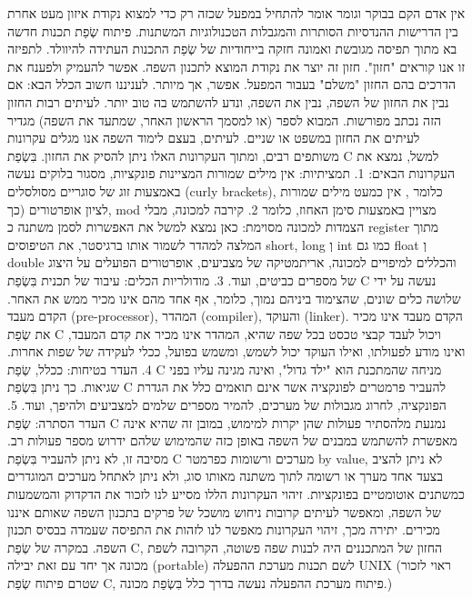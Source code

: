       אין אדם הקם בבוקר וגומר אומר להתחיל במפעל שכזה רק כדי למצוא נקודת איזון מעט אחרת בין הדרישות ההנדסיות הסותרות והמגבלות הטכנולוגיות המשתנות.
      פיתוח שְׂפַת תכנות חדשה בא מתוך תפיסה מגובשת ואמונה חזקה בייחודיות של שְׂפַת התכנות העתידה להיוולד. לתפיזה זו אנו קוראים "חזון". חזון זה יוצר את נקודת המוצא לתכנון השפה. אפשר להעמיק ולפענח את הדרכים בהם החזון "משלם" בעבור המפעל. אפשר, אך מיותר. לעניננו חשוב הכלל הבא: אם נבין את החזון של השפה, נבין את השפה, ונדע להשתמש בה טוב יותר.
      לעיתים רבות החזון הזה נכתב מפורשות. המבוא לספר (או למסמך הראשון האחר, שמתעד את השפה) מגדיר לעיתים את החזון במשפט או שניים. לעיתים, בעצם לימוד השפה אנו מגלים עקרונות משותפים רבים, ומתוך העקרונות האלו ניתן להסיק את החזון.
      בִּשְׂפַת C למשל, נמצא את העקרונות הבאים:
      1. תמציתיות: אין מילים שמורות המציינות פונקציות, מסגור בלוקים נעשה באמצעות זוג של סוגריים מסולסלים (curly brackets), כלומר {}, אין כמעט מילים שמורות לציון אופרטורים (כך, mod מצויין באמצעות סימן האחוז, כלומר %
      2. קירבה למכונה, מבלי הצמדות למכונה מסוימת: כאן נמצא למשל את האפשרות לסמן משתנה כ register מתוך המלצה למהדר לשמור אותו ברגיסטר, את הטיפוסים short, long וְ int כמו גם float וְ double והכללים למיפויים למכונה, אריתמטיקה של מצביעים, אופרטורים הפועלים על היצוג של מספרים כביטים, ועוד.
      3. מודולריות הכלים: עיבוד של תכנית בִּשְׂפַת C נעשה על ידי שלושה כלים שונים, שהצימוד ביניהם נמוך, כלומר, אף אחד מהם אינו מכיר ממש את האחר. הקדם מעבד (pre-processor), המהדר (compiler), והעוקד (linker). הקדם מעבד אינו מכיר את שְׂפַת C ויכול לעבד קבצי טכסט בכל שפה שהיא, המהדר אינו מכיר את קדם המעבד, ואינו מודע לפעולתו, ואילו העוקד יכול לשמש, ומשמש בפועל, ככלי לעקידה של שפות אחרות.
      4. העדר בטיחות: ככלל, שְׂפַת C מניחה שהמתכנת הוא "ילד גדול", ואינה מגינה עליו בפני שגיאות. כך ניתן בִּשְׂפַת C להעביר פרמטרים לפונקציה אשר אינם תואמים כלל את הגדרת הפונקציה, לחרוג מגבולות של מערכים, להמיר מספרים שלמים למצביעים ולהיפך, ועוד.
      5. העדר הסתרה: שְׂפַת C נמנעת מלהסתיר פעולות שהן יקרות למימוש, במובן זה שהיא אינה מאפשרת להשתמש במבנים של השפה באופן כזה שהמימוש שלהם ידרוש מספר פעולות רב. מסיבה זו, לא ניתן להעביר בִּשְׂפַת C מערכים ורשומות כפרמטר by value, לא ניתן להציב בצעד אחד מערך או רשומה לתוך משתנה מאותו סוג, ולא ניתן לאתחל מערכים המוגדרים כמשתנים אוטומטיים בפונקציות.
      זיהוי העקרונות הללו מסייע לנו לזכור את הדקדוק והמשמעות של השפה, ומאפשר לעיתים קרובות ניחוש מושכל של פרקים בתכנון השפה שאותם איננו מכירים. יתירה מכך, זיהוי העקרונות מאפשר לנו לזהות את התפיסה שעמדה בבסיס תכנון השפה. במקרה של שְׂפַת C, החזון של המתכננים היה לבנות שפה פשוטה, הקרובה לשפת מכונה אך יחד עם זאת יבילה (portable) לשם תכנות מערכת ההפעלה UNIX (ראוי לזכור שטרם פיתוח שְׂפַת C, פיתוח מערכת ההפעלה נעשה בדרך כלל בִּשְׂפַת מכונה.)
